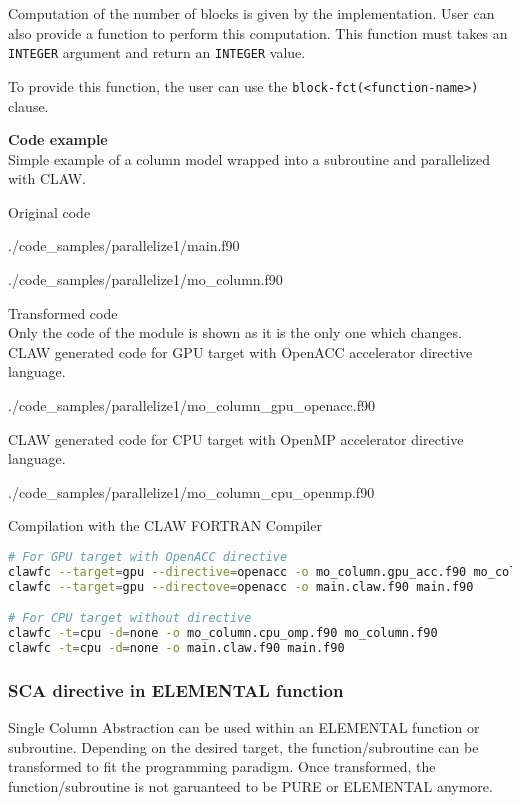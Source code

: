 Computation of the number of blocks is given by the implementation. User can
also provide a function to perform this computation. This function must takes an
\lstinline|INTEGER| argument and return an \lstinline|INTEGER| value.

To provide this function, the user can use the
\lstinline|block-fct(<function-name>)| clause.

\textbf{Code example}\\
\label{parallelize1}
Simple example of a column model wrapped into a subroutine and parallelized with
CLAW.

Original code

  {./code_samples/parallelize1/main.f90}

  {./code_samples/parallelize1/mo_column.f90}

Transformed code\\
Only the code of the module is shown as it is the only one which changes.\\

CLAW generated code for GPU target with OpenACC accelerator directive language.

  {./code_samples/parallelize1/mo_column_gpu_openacc.f90}

CLAW generated code for CPU target with OpenMP accelerator directive language.

  {./code_samples/parallelize1/mo_column_cpu_openmp.f90}

Compilation with the CLAW FORTRAN Compiler
\begin{lstlisting}[language=bash]
# For GPU target with OpenACC directive
clawfc --target=gpu --directive=openacc -o mo_column.gpu_acc.f90 mo_column.f90
clawfc --target=gpu --directove=openacc -o main.claw.f90 main.f90

# For CPU target without directive
clawfc -t=cpu -d=none -o mo_column.cpu_omp.f90 mo_column.f90
clawfc -t=cpu -d=none -o main.claw.f90 main.f90
\end{lstlisting}

\subsubsection{SCA directive in ELEMENTAL function}
Single Column Abstraction can be used within an ELEMENTAL function or
subroutine. Depending on the desired target, the function/subroutine can be
transformed to fit the programming paradigm. Once transformed, the
function/subroutine is not garuanteed to be PURE or ELEMENTAL anymore.

